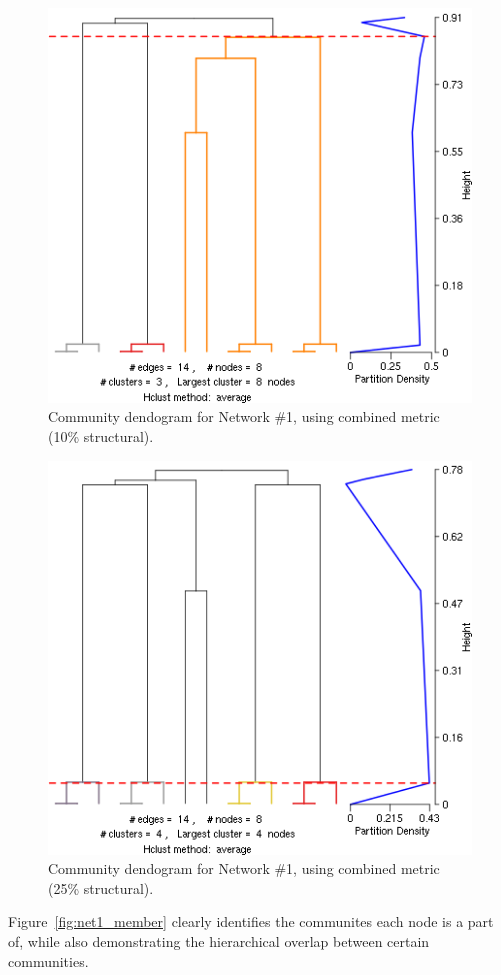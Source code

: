 \documentclass{report} %
\begin{document}
\begin{figure}[htp!]
  \centering
  \includegraphics[width=0.5\linewidth]{toy2/ea/lc_0.1.png}
  \caption{Community dendogram for Network \#1, using combined metric (10\% structural).}
  \label{fig:net1_dend_10}
\end{figure}

\begin{figure}[htp!]
  \centering
  \includegraphics[width=0.5\linewidth]{toy2/ea/lc_0.25.png}
  \caption{Community dendogram for Network \#1, using combined metric (25\% structural).}
  \label{fig:net1_dend_25}
\end{figure}

\newpage
Figure~\ref{fig:net1_member} clearly identifies the communites each node is a part of, while also demonstrating the hierarchical overlap between certain communities.\\
\end{document}
